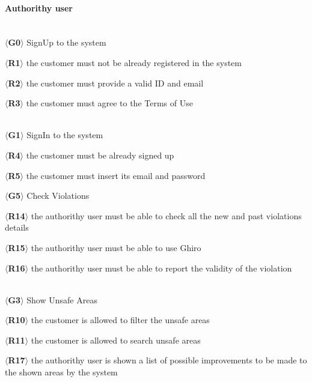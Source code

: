 \documentclass{article}
\begin{document}
\paragraph{Authorithy user}\mbox{}\\
$\langle$\textbf{G0}$\rangle$ SignUp to the system
\begin{description}
    \item $\langle$\textbf{R1}$\rangle$ the customer must not be already
    registered  in the system
    \item $\langle$\textbf{R2}$\rangle$ the customer must provide a valid ID and
    email
    \item $\langle$\textbf{R3}$\rangle$ the customer must agree to the Terms of
Use \end{description}\mbox{}\\
$\langle$\textbf{G1}$\rangle$ SignIn to the system
\begin{description}
    \item $\langle$\textbf{R4}$\rangle$ the customer must be already signed up
    \item $\langle$\textbf{R5}$\rangle$ the customer must insert its email and
    password\\
\end{description}
$\langle$\textbf{G5}$\rangle$ Check Violations
\begin{description}
    \item $\langle$\textbf{R14}$\rangle$ the authorithy user must be able to check
    all the new and past violations details
    \item $\langle$\textbf{R15}$\rangle$ the authorithy user must be able to use
    Ghiro
    \item $\langle$\textbf{R16}$\rangle$ the authorithy user must be able to report
    the validity of the violation \end{description}\mbox{}\\
$\langle$\textbf{G3}$\rangle$ Show Unsafe Areas
\begin{description}
    \item $\langle$\textbf{R10}$\rangle$ the customer is allowed to filter the
    unsafe areas
    \item $\langle$\textbf{R11}$\rangle$ the customer is allowed to search
    unsafe areas 
    \item $\langle$\textbf{R17}$\rangle$ the authorithy user is shown a list of
    possible improvements to be made to the shown areas by the system
\end{description}
\end{document}
